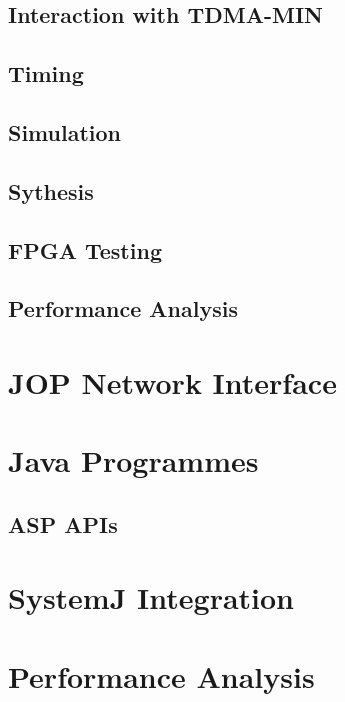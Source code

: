 \documentclass[journal, onecolumn]{IEEEtran}
\begin{document}
		\subsection{Interaction with TDMA-MIN}
		
		\subsection{Timing}
				
		\subsection{Simulation}
		
		\subsection{Sythesis}
		
		\subsection{FPGA Testing}

		\subsection{Performance Analysis}
		
		

	\section{JOP Network Interface}



	\section{Java Programmes}

		\subsection{ASP APIs}

	\section{SystemJ Integration}



	\section{Performance Analysis}
\end{document}
